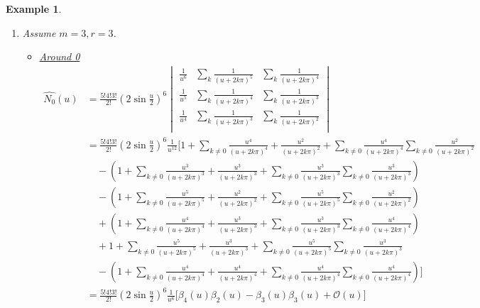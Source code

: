 \documentclass[a4paper, 11pt]{article}
\newtheorem{example}{Example}
\begin{document}
\begin{example}
\begin{enumerate}
    \item Assume $m=3, r=3$.
      \begin{itemize}
	\item \underline{Around 0}
	  \begin{align*}
	    \hat{N_0}(u) &= \frac{5!4!3!}{2!} {\left(2 \sin \frac{u}{2} \right)}^{6}   
	    \begin{vmatrix}
	      \frac{1}{u^6} & \sum_{k} \frac{1}{{(u+2k\pi)}^{5}}& \sum_{k} \frac{1}{{(u+2k\pi)}^{4}} \\
	      \frac{1}{u^5} & \sum_{k} \frac{1}{{(u+2k\pi)}^{4}}& \sum_{k} \frac{1}{{(u+2k\pi)}^{3}} \\
	      \frac{1}{u^4} & \sum_{k} \frac{1}{{(u+2k\pi)}^{3}}& \sum_{k} \frac{1}{{(u+2k\pi)}^{2}} \\
	    \end{vmatrix} \\
	    &=  \frac{5!4!3!}{2!} {\left(2 \sin \frac{u}{2} \right)}^{6}  \frac{1}{u^{12}} \Big[ 1+ \sum_{k \neq 0} 
	      \frac{u^4}{{(u+2k\pi)}^{4}} + \frac{u^2}{{(u+2k\pi)}^{2}} + \sum_{k \neq 0}\frac{u^4}{{(u+2k\pi)}^{4}} \sum_{k 
	      \neq 0}\frac{u^2}{{(u+2k\pi)}^{2}} \\
	    & \quad - (1+ \sum_{k \neq 0} \frac{u^3}{{(u+2k\pi)}^{3}} + \frac{u^3}{{(u+2k\pi)}^{3}} + \sum_{k \neq 0} 
	    \frac{u^3}{{(u+2k\pi)}^{3}}\sum_{k \neq 0} \frac{u^3}{{(u+2k\pi)}^{3}})  \\
	    & \quad - (1+ \sum_{k \neq 0} \frac{u^5}{{(u+2k\pi)}^{5}} + \frac{u^2}{{(u+2k\pi)}^{2}} + \sum_{k \neq 
	    0}\frac{u^5}{{(u+2k\pi)}^{5}} \sum_{k \neq 0}\frac{u^2}{{(u+2k\pi)}^{2}}) \\
	    & \quad + (1+ \sum_{k \neq 0} \frac{u^4}{{(u+2k\pi)}^{4}} + \frac{u^3}{{(u+2k\pi)}^{3}} + \sum_{k \neq 0} 
	  \frac{u^3}{{(u+2k\pi)}^{3}}\sum_{k \neq 0} \frac{u^4}{{(u+2k\pi)}^{4}}) \\
	   &\quad + 1+ \sum_{k \neq 0} 
	      \frac{u^5}{{(u+2k\pi)}^{5}} + \frac{u^3}{{(u+2k\pi)}^{3}} + \sum_{k \neq 0}\frac{u^5}{{(u+2k\pi)}^{5}} \sum_{k 
	      \neq 0}\frac{u^3}{{(u+2k\pi)}^{3}} \\
	    & \quad - (1+ \sum_{k \neq 0} \frac{u^4}{{(u+2k\pi)}^{4}} + \frac{u^4}{{(u+2k\pi)}^{4}} + \sum_{k \neq 0} 
	    \frac{u^4}{{(u+2k\pi)}^{4}}\sum_{k \neq 0} \frac{u^4}{{(u+2k\pi)}^{4}}) \Big] \\
	    &= \frac{5!4!3!}{2!} {\left(2 \sin \frac{u}{2} \right)}^{6}  \frac{1}{u^6} \Big[\beta_4(u)\beta_2(u) - 
	    \beta_3(u)\beta_3(u) + \mathcal{O}(u) \Big]
	  \end{align*}


\end{itemize}
\end{enumerate}
\end{example}
\end{document}
